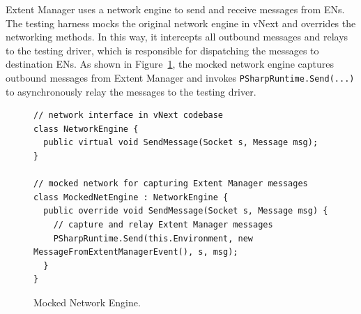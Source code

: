 Extent Manager uses a network engine to send and receive messages from ENs. The testing harness mocks the original network engine in vNext and overrides the networking methods. In this way, it intercepts all outbound messages and relays to the testing driver, which is responsible for dispatching the messages to destination ENs. As shown in Figure~\ref{fig:enginecode}, the mocked network engine captures outbound messages from Extent Manager and invokes \texttt{PSharpRuntime.Send(...)} to asynchronously relay the messages to the testing driver.

\begin{figure}[t]
\begin{lstlisting}
// network interface in vNext codebase
class NetworkEngine {
  public virtual void SendMessage(Socket s, Message msg);
}

// mocked network for capturing Extent Manager messages
class MockedNetEngine : NetworkEngine {
  public override void SendMessage(Socket s, Message msg) {
    // capture and relay Extent Manager messages
    PSharpRuntime.Send(this.Environment, new MessageFromExtentManagerEvent(), s, msg);
  }
}
\end{lstlisting}
\vspace{-2mm}
\caption{Mocked Network Engine.}
\label{fig:enginecode}
\end{figure}



